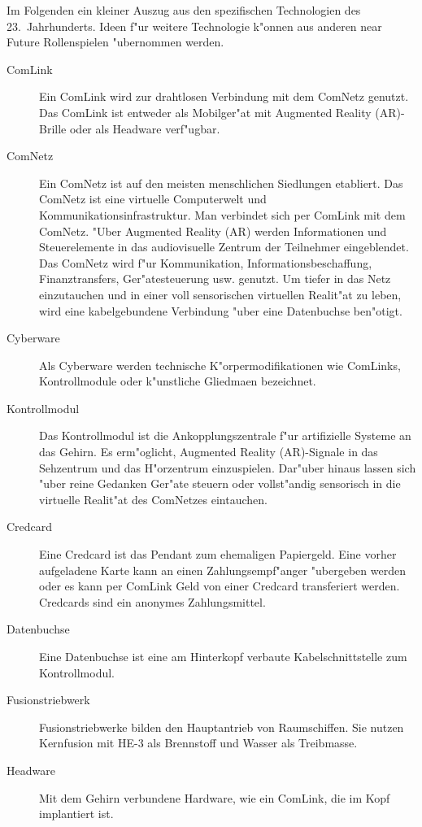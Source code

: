 
Im Folgenden ein kleiner Auszug aus den spezifischen Technologien des 23.~Jahrhunderts. Ideen f"ur weitere Technologie k"onnen aus anderen near Future Rollenspielen "ubernommen werden.

\begin{description}
\item [ComLink] Ein ComLink wird zur drahtlosen Verbindung mit dem ComNetz genutzt. Das ComLink ist entweder als Mobilger"at mit     
      Augmented Reality (AR)-Brille oder als Headware verf"ugbar.
\item [ComNetz] Ein ComNetz ist auf den meisten menschlichen Siedlungen etabliert. Das ComNetz ist eine virtuelle Computerwelt und 
      Kommunikationsinfrastruktur. Man verbindet sich per ComLink mit dem ComNetz. "Uber Augmented Reality (AR) werden Informationen und Steuerelemente in das audiovisuelle Zentrum der Teilnehmer eingeblendet. Das ComNetz wird f"ur Kommunikation, Informationsbeschaffung, Finanztransfers, Ger"atesteuerung usw. genutzt. Um tiefer in das Netz einzutauchen und in einer voll sensorischen virtuellen Realit"at zu leben, wird eine kabelgebundene Verbindung "uber eine Datenbuchse ben"otigt.
\item [Cyberware] Als Cyberware werden technische K"orpermodifikationen wie ComLinks, Kontrollmodule oder k"unstliche Gliedma\3en 
      bezeichnet.
\item [Kontrollmodul] Das Kontrollmodul ist die Ankopplungszentrale f"ur artifizielle Systeme an das Gehirn. Es erm"oglicht, Augmented 
      Reality (AR)-Signale in das Sehzentrum und das H"orzentrum einzuspielen. Dar"uber hinaus lassen sich "uber reine Gedanken Ger"ate steuern oder vollst"andig sensorisch in die virtuelle Realit"at des ComNetzes eintauchen.
\item [Credcard] Eine Credcard ist das Pendant zum ehemaligen Papiergeld. Eine vorher aufgeladene Karte kann an einen 
      Zahlungsempf"anger "ubergeben werden oder es kann per ComLink Geld von einer Credcard transferiert werden. Credcards sind ein anonymes Zahlungsmittel.
\item [Datenbuchse] Eine Datenbuchse ist eine am Hinterkopf verbaute Kabelschnittstelle zum Kontrollmodul.
\item [Fusionstriebwerk] Fusionstriebwerke bilden den Hauptantrieb von Raumschiffen. Sie nutzen Kernfusion mit HE-3 als Brennstoff 
      und Wasser als Treibmasse.
\item [Headware] Mit dem Gehirn verbundene Hardware, wie ein ComLink, die im Kopf implantiert ist.

\end{description}
